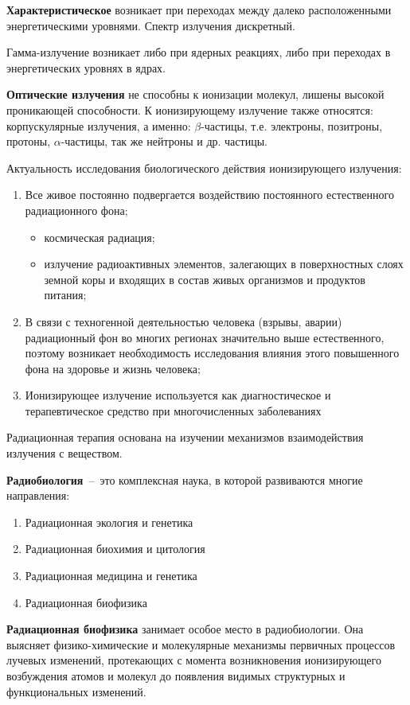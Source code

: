 \documentclass[a4paper, 14pt]{article}
\begin{document}
\textbf{Характеристическое} возникает при переходах между далеко расположенными
энергетическими уровнями. Спектр излучения дискретный.

Гамма-излучение возникает либо при ядерных реакциях, либо при переходах в
энергетических уровнях в ядрах.

\textbf{Оптические излучения} не способны к ионизации молекул, лишены высокой
проникающей способности.
К ионизирующему излучение также относятся: корпускулярные излучения, а именно: $\beta$-частицы, т.е. электроны, позитроны, протоны, $\alpha$-частицы, так же нейтроны и др. частицы.

Актуальность исследования биологического действия ионизирующего излучения:
\begin{enumerate}
    \item Все живое постоянно подвергается воздействию постоянного естественного
    радиационного фона;
    \begin{itemize}
        \item космическая радиация;
        \item излучение радиоактивных элементов, залегающих в поверхностных слоях
        земной коры и входящих в состав живых организмов и продуктов питания;
    \end{itemize}
    \item В связи с техногенной деятельностью человека (взрывы, аварии)
    радиационный фон во многих регионах значительно выше естественного, поэтому
    возникает необходимость исследования влияния этого повышенного фона на здоровье
    и жизнь человека;
    \item Ионизирующее излучение используется как диагностическое и
    терапевтическое средство при многочисленных заболеваниях
\end{enumerate}
Радиационная терапия основана на изучении механизмов взаимодействия
излучения с веществом.

\textbf{Радиобиология}~--~это комплексная наука, в которой развиваются многие
направления:
\begin{enumerate}
    \item Радиационная экология и генетика
    \item Радиационная биохимия и цитология
    \item Радиационная медицина и генетика
    \item Радиационная биофизика
\end{enumerate}

\textbf{Радиационная биофизика} занимает особое место в радиобиологии. Она
выясняет физико-химические и молекулярные механизмы первичных процессов
лучевых изменений, протекающих с момента возникновения ионизирующего
возбуждения атомов и молекул до появления видимых структурных и функциональных изменений.
\end{document}
